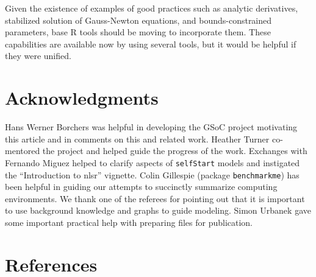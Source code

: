 Given the existence of examples of good practices such as analytic derivatives,
stabilized solution of Gauss-Newton equations, and bounds-constrained parameters,
base R tools should
be moving to incorporate them. These capabilities are available now by
using several tools, but it would be helpful if they were unified.

\hypertarget{acknowledgments}{%
\section{Acknowledgments}\label{acknowledgments}}

Hans Werner Borchers was helpful in developing the GSoC project motivating this article
and in comments on this and related work. Heather Turner co-mentored the project
and helped guide the progress of the work. Exchanges with Fernando Miguez helped to
clarify aspects of \texttt{selfStart} models and instigated the ``Introduction to nlsr''
vignette. Colin Gillespie (package \texttt{benchmarkme}) has been helpful in guiding our
attempts to succinctly summarize computing environments. We thank one of the referees
for pointing out that it is important to use background knowledge and graphs to
guide modeling. Simon Urbanek gave some important practical help with preparing
files for publication.

\hypertarget{references}{%
\section*{References}\label{references}}

